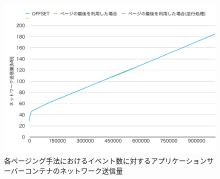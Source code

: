 \documentclass[../../../../../main]{subfiles}
\begin{document}
    \begin{figure}[H]
        \centering
        \includegraphics[width=12cm]{graph}
        \caption{各ページング手法におけるイベント数に対するアプリケーションサーバーコンテナのネットワーク送信量}
        \label{fig:each-paging-app-net-out-app_1_1024-db_1_1024}
    \end{figure}
\end{document}
